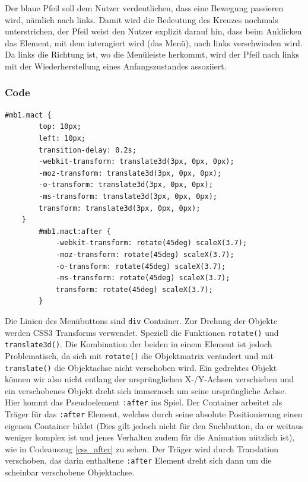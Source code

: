 Der blaue Pfeil soll dem Nutzer verdeutlichen, dass eine Bewegung passieren wird, nämlich nach links. Damit wird die Bedeutung des Kreuzes nochmals unterstrichen, der Pfeil weist den Nutzer explizit darauf hin, dass beim Anklicken das Element, mit dem interagiert wird (das Menü), nach links verschwinden wird. Da links die Richtung ist, wo die Menüleiste herkommt, wird der Pfeil nach links mit der Wiederherstellung eines Anfangszustandes assoziiert.


\subsubsection{Code}


\begin{lstlisting}[caption=Die Trennung von rotate() und translate()., label=css_after]
#mb1.mact {
        top: 10px;
        left: 10px;
        transition-delay: 0.2s;
        -webkit-transform: translate3d(3px, 0px, 0px);
        -moz-transform: translate3d(3px, 0px, 0px);
        -o-transform: translate3d(3px, 0px, 0px);
        -ms-transform: translate3d(3px, 0px, 0px);
        transform: translate3d(3px, 0px, 0px);
    }
        #mb1.mact:after {
            -webkit-transform: rotate(45deg) scaleX(3.7);
            -moz-transform: rotate(45deg) scaleX(3.7);
            -o-transform: rotate(45deg) scaleX(3.7);
            -ms-transform: rotate(45deg) scaleX(3.7);
            transform: rotate(45deg) scaleX(3.7);
        }
\end{lstlisting}

Die Linien des Menübuttons sind \lstinline{div} Container. Zur Drehung der Objekte werden CSS3 Transforms verwendet. Speziell die Funktionen \lstinline{rotate()} und \lstinline{translate3d()}. Die Kombination der beiden in einem Element ist jedoch Problematisch, da sich mit \lstinline{rotate()} die Objektmatrix verändert und mit \lstinline{translate()} die Objektachse nicht verschoben wird. Ein gedrehtes Objekt können wir also nicht entlang der ursprünglichen X-/Y-Achsen verschieben und ein verschobenes Objekt dreht sich immernoch um seine ursprüngliche Achse. Hier kommt das Pseudoelement \lstinline{:after} ins Spiel. Der Container arbeitet als Träger für das \lstinline{:after} Element, welches durch seine absolute Positionierung einen eigenen Container bildet (Dies gilt jedoch nicht für den Suchbutton, da er weitaus weniger komplex ist und jenes Verhalten zudem für die Animation nützlich ist), wie in Codeauszug \ref{css_after} zu sehen. Der Träger wird durch Translation verschoben, das darin enthaltene \lstinline{:after} Element dreht sich dann um die scheinbar verschobene Objektachse.



